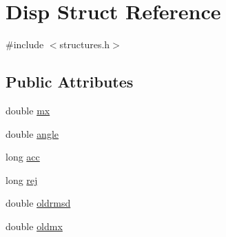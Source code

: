 \hypertarget{struct_disp}{\section{Disp Struct Reference}
\label{struct_disp}
}


{\ttfamily \#include $<$structures.\+h$>$}

\subsection*{Public Attributes}
\begin{DoxyCompactItemize}
\item 
double \hyperlink{struct_disp_a12da7c0801e5ce844e28b7a785b7556c}{mx}
\item 
double \hyperlink{struct_disp_a40442346e379ba0674a8401502551b3a}{angle}
\item 
long \hyperlink{struct_disp_a2f55a3f871df675bd8eedbaa706b4c03}{acc}
\item 
long \hyperlink{struct_disp_adcb197b8efb6392c5d08e1222cd488ee}{rej}
\item 
double \hyperlink{struct_disp_ad895f0ec10cdd0f00de4a65667566f5b}{oldrmsd}
\item 
double \hyperlink{struct_disp_a3aa81c561f1dac48d4c486468b960919}{oldmx}
\end{DoxyCompactItemize}


